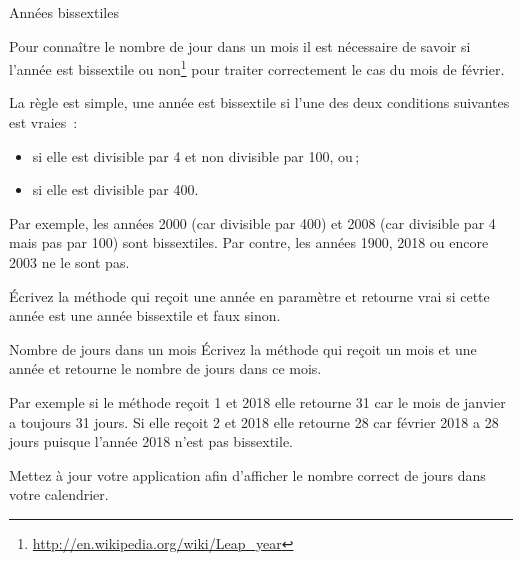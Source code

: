 \documentclass[a4paper,11pt]{style-esi/td}
\begin{document}
 	\begin{Exercice}{Années bissextiles}
	 
		Pour connaître le nombre de jour dans un mois il est nécessaire de
		savoir si l'année est bissextile ou
		non\footnote{\url{http://en.wikipedia.org/wiki/Leap_year}} pour traiter
		correctement le cas du mois de février. 
	 
		La règle est simple, une année est bissextile si l'une des deux
		conditions suivantes est vraies~:
		
	 \begin{itemize}
			\item si elle est divisible par 4 et non divisible par 100, ou\,;
			\item si elle est divisible par 400.
		\end{itemize}
		
		Par exemple, les années 2000 (car divisible par 400) et 2008 (car divisible par 4 mais pas par 100)
		 sont bissextiles.
		 Par contre, les années 1900, 2018 ou encore 2003 ne le sont pas.

		\'Ecrivez la méthode  qui reçoit une année en paramètre et 
		retourne vrai si cette année est une année bissextile et faux sinon.

	\end{Exercice} 



 	\begin{Exercice}{Nombre de jours dans un mois}
		\'Ecrivez la méthode  qui reçoit un mois et une année et 
		retourne le nombre de jours dans ce mois.
		
		Par exemple si le méthode reçoit 1 et 2018 elle retourne 31 car le mois de janvier a toujours 31 jours.
		Si elle reçoit 2 et 2018 elle retourne 28 car février 2018 a 28 jours puisque l'année 2018 n'est pas bissextile.
		
		Mettez à jour votre application afin d'afficher le nombre correct de jours dans votre calendrier.
	\end{Exercice} 
\end{document}
